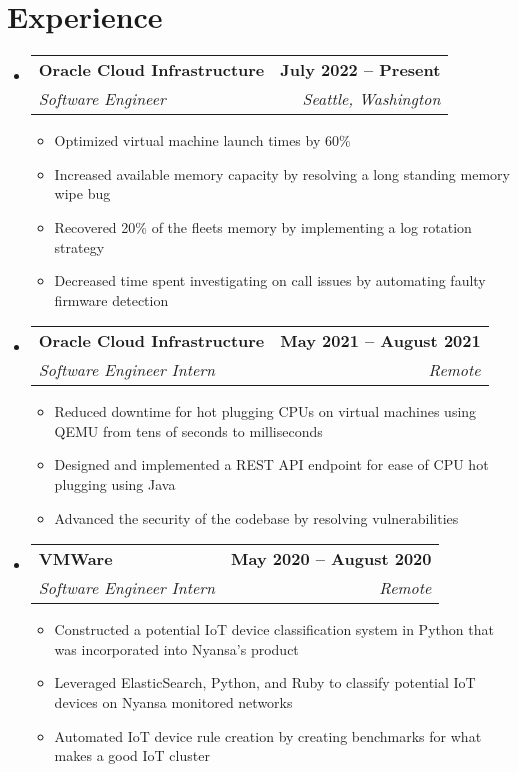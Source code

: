 \documentclass[letterpaper,11pt]{article}
\makeatletter
\newcommand{\resumeItem}[1]{
  \item\small{
    {#1 \vspace{-2pt}}
  }
}
\newcommand{\resumeSubheading}[4]{
  \vspace{-2pt}\item
    \begin{tabular*}{1.0\textwidth}[t]{l@{\extracolsep{\fill}}r}
      \textbf{#1} & \textbf{\small #2} \\
      \textit{\small#3} & \textit{\small #4} \\
    \end{tabular*}\vspace{-7pt}
}
\newcommand{\resumeSubHeadingListStart}{\begin{itemize}[leftmargin=0.0in, label={}]}
\newcommand{\resumeSubHeadingListEnd}{\end{itemize}}
\newcommand{\resumeItemListStart}{\begin{itemize}}
\newcommand{\resumeItemListEnd}{\end{itemize}\vspace{-5pt}}
\makeatother
\begin{document}
\section{Experience}
  \resumeSubHeadingListStart

    \resumeSubheading
      {Oracle Cloud Infrastructure}{July 2022 -- Present}
      {Software Engineer}{Seattle, Washington}
      \resumeItemListStart
        \resumeItem{Optimized virtual machine launch times by 60\%}
        \resumeItem{Increased available memory capacity by resolving a long standing memory wipe bug}
        \resumeItem{Recovered 20\% of the fleets memory by implementing a log rotation strategy}
        \resumeItem{Decreased time spent investigating on call issues by automating faulty firmware detection}
      \resumeItemListEnd

    \resumeSubheading
      {Oracle Cloud Infrastructure}{May 2021 -- August 2021}
      {Software Engineer Intern}{Remote}
      \resumeItemListStart
        \resumeItem{Reduced downtime for hot plugging CPUs on virtual machines using QEMU from tens of seconds to milliseconds}
        \resumeItem{Designed and implemented  a REST API endpoint for ease of CPU hot plugging using Java}
        \resumeItem{Advanced the security of the codebase by resolving vulnerabilities}
    \resumeItemListEnd

    \resumeSubheading
      {VMWare}{May 2020 -- August 2020}
      {Software Engineer Intern}{Remote}
      \resumeItemListStart
        \resumeItem{Constructed a potential IoT device classification system in Python that was incorporated into Nyansa’s product}
        \resumeItem{Leveraged ElasticSearch, Python, and Ruby to classify potential IoT devices on Nyansa monitored networks}
        \resumeItem{Automated IoT device rule creation by creating benchmarks for what makes a good IoT cluster}
    \resumeItemListEnd
    
  \resumeSubHeadingListEnd
\vspace{-16pt}

\end{document}
